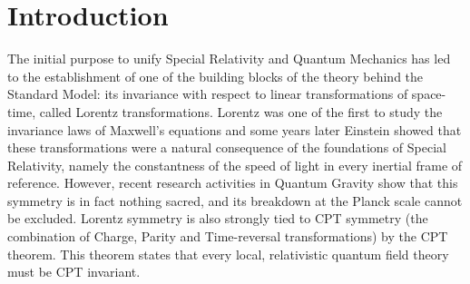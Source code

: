\section*{Introduction}

	The initial purpose to unify Special Relativity and Quantum Mechanics has led to the establishment of one of the building blocks of the theory behind the Standard Model: its invariance with respect to linear transformations of space-time, called Lorentz transformations. Lorentz was one of the first to study the invariance laws of Maxwell's equations and some years later Einstein showed that these transformations were a natural consequence of the foundations of Special Relativity, namely the constantness of the speed of light in every inertial frame of reference. However, recent research activities in Quantum Gravity show that this symmetry is in fact nothing sacred, and its breakdown at the Planck scale cannot be excluded. Lorentz symmetry is also strongly tied to CPT symmetry (the combination of Charge, Parity and Time-reversal transformations) by the CPT theorem. This theorem states that every local, relativistic quantum field theory must be CPT invariant.

